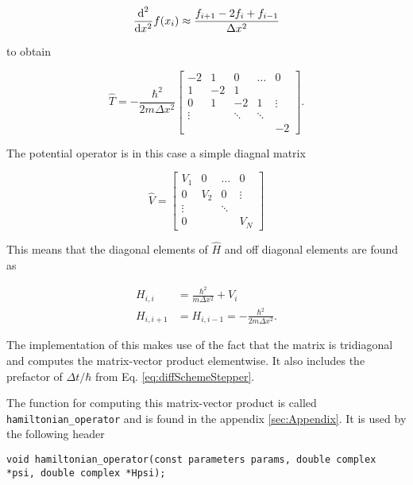 \begin{equation}
  \frac{\textnormal{d}^2}{\textnormal{d} x^2}f(x_i) \approx \frac{f_{i+1}-2f_i + f_{i-1}}{\Delta x^2}
\end{equation}

to obtain

\begin{equation}
  \label{eq:kineticOP}
  \hat T = -\frac{\hbar^2}{2m\Delta x^2}\begin{bmatrix}
    -2 & 1 & 0 & \hdots & 0 \\
    1 & -2 & 1 & & \\
    0 & 1 & -2 & 1 &  \vdots \\
    \vdots & & \ddots &\ddots & \\
    & & & & -2
  \end{bmatrix}.
\end{equation}

The potential operator is in this case a simple diagnal matrix

\begin{equation}
  \label{eq:potOP}
  \hat V = \begin{bmatrix}
    V_1 & 0 & \hdots & 0 \\
    0 & V_2 & 0 &  \vdots\\
    \vdots & & \ddots &  \\
    0& & & V_N
  \end{bmatrix}
\end{equation}

This means that the diagonal elements of $\hat H$ and off diagonal elements are found as

\begin{equation}
  \label{eq:Helements}
  \begin{split}
    H_{i,i} &= \frac{\hbar^2}{m\Delta x^2} + V_i \\
    H_{i,i+1} &= H_{i,i-1} = -\frac{\hbar^2}{2m\Delta x^2}.
  \end{split}
\end{equation}

The implementation of this makes use of the fact that the matrix is tridiagonal and computes the matrix-vector product elementwise. It also includes the prefactor of $\Delta t/\hbar$ from Eq. \ref{eq:diffSchemeStepper}.

The function for computing this matrix-vector product is called \verb|hamiltonian_operator| and is found in the appendix \ref{sec:Appendix}. It is used by the following header

\verb|void hamiltonian_operator(const parameters params,|\newline\verb| double complex *psi, double complex *Hpsi);|

